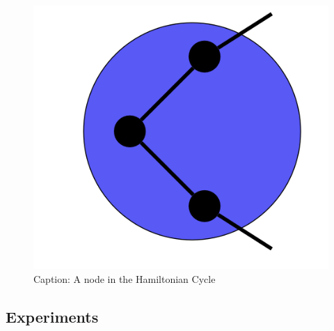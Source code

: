 \documentclass{article}
\begin{document}
\begin{figure}[!ht]
    \centering
    \includegraphics[scale=.5]{assets/degrees.png}
    \caption{Caption: A node in the Hamiltonian Cycle}
    \label{fig:degrees}
\end{figure}
\newpage 

\subsection{Experiments}
\end{document}
